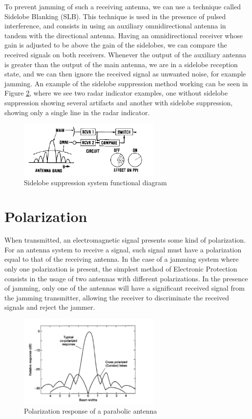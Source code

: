 \documentclass[english,purist]{ist-report}
\begin{document}
To prevent jamming of such a receiving antenna, we can use a technique called Sidelobe Blanking (SLB). This technique is used in the presence of pulsed interference, and consists in using an auxiliary omnidirectional antenna in tandem with the directional antenna. Having an omnidirectional receiver whose gain is adjusted to be above the gain of the sidelobes, we can compare the received signals on both receivers. Whenever the output of the auxiliary antenna is greater than the output of the main antenna, we are in a sidelobe reception state, and we can then ignore the received signal as unwanted noise, for example jamming. An example of the sidelobe suppression method working can be seen in Figure \ref{sidelobe_suppression}, where we see two radar indicator examples, one without sidelobe suppression showing several artifacts and another with sidelobe suppression, showing only a single line in the radar indicator.

\begin{figure}[ht]
\centering
\includegraphics[width=70mm]{sidelobe_suppresion.png}
\caption{Sidelobe suppression system functional diagram}
\label{sidelobe_suppression}
\end{figure} 

\section{Polarization}

When transmitted, an electromagnetic signal presents some kind of polarization. For an antenna system to receive a signal, such signal must have a polarization equal to that of the receiving antenna. In the case of a jamming system where only one polarization is present, the simplest method of Electronic Protection consists in the usage of two antennas with different polarizations. In the presence of jamming, only one of the antennas will have a significant received signal from the jamming transmitter, allowing the receiver to discriminate the received signals and reject the jammer. 

\begin{figure}[ht]
\centering
\includegraphics[width=70mm]{parabolic_polarization_response.png}
\caption{Polarization response of a parabolic antenna}
\label{sidelobe_suppression}
\end{figure} 
\end{document}
